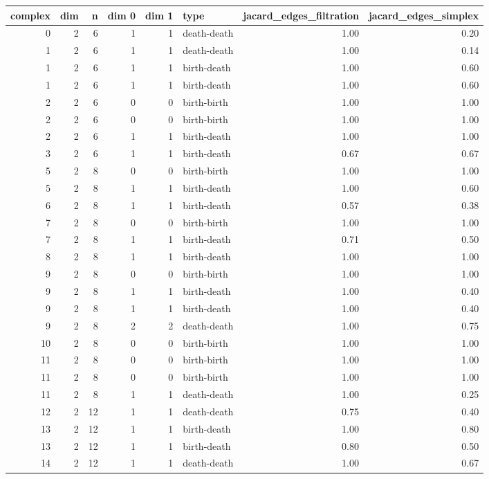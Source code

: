 \documentclass{article}
\begin{document}
\begin{center}
\begin{tabular}{rrrrrlrr}
\toprule
complex & dim & n & dim 0 & dim 1 & type & jacard\_edges\_filtration & jacard\_edges\_simplex \\
\midrule
0 & 2 & 6 & 1 & 1 & death-death & 1.00 & 0.20 \\
1 & 2 & 6 & 1 & 1 & death-death & 1.00 & 0.14 \\
1 & 2 & 6 & 1 & 1 & birth-death & 1.00 & 0.60 \\
1 & 2 & 6 & 1 & 1 & birth-death & 1.00 & 0.60 \\
2 & 2 & 6 & 0 & 0 & birth-birth & 1.00 & 1.00 \\
2 & 2 & 6 & 0 & 0 & birth-birth & 1.00 & 1.00 \\
2 & 2 & 6 & 1 & 1 & birth-death & 1.00 & 1.00 \\
3 & 2 & 6 & 1 & 1 & birth-death & 0.67 & 0.67 \\
5 & 2 & 8 & 0 & 0 & birth-birth & 1.00 & 1.00 \\
5 & 2 & 8 & 1 & 1 & birth-death & 1.00 & 0.60 \\
6 & 2 & 8 & 1 & 1 & birth-death & 0.57 & 0.38 \\
7 & 2 & 8 & 0 & 0 & birth-birth & 1.00 & 1.00 \\
7 & 2 & 8 & 1 & 1 & birth-death & 0.71 & 0.50 \\
8 & 2 & 8 & 1 & 1 & birth-death & 1.00 & 1.00 \\
9 & 2 & 8 & 0 & 0 & birth-birth & 1.00 & 1.00 \\
9 & 2 & 8 & 1 & 1 & birth-death & 1.00 & 0.40 \\
9 & 2 & 8 & 1 & 1 & birth-death & 1.00 & 0.40 \\
9 & 2 & 8 & 2 & 2 & death-death & 1.00 & 0.75 \\
10 & 2 & 8 & 0 & 0 & birth-birth & 1.00 & 1.00 \\
11 & 2 & 8 & 0 & 0 & birth-birth & 1.00 & 1.00 \\
11 & 2 & 8 & 0 & 0 & birth-birth & 1.00 & 1.00 \\
11 & 2 & 8 & 1 & 1 & death-death & 1.00 & 0.25 \\
12 & 2 & 12 & 1 & 1 & death-death & 0.75 & 0.40 \\
13 & 2 & 12 & 1 & 1 & birth-death & 1.00 & 0.80 \\
13 & 2 & 12 & 1 & 1 & birth-death & 0.80 & 0.50 \\
14 & 2 & 12 & 1 & 1 & death-death & 1.00 & 0.67 \\

\end{tabular}
\end{center}
\end{document}
